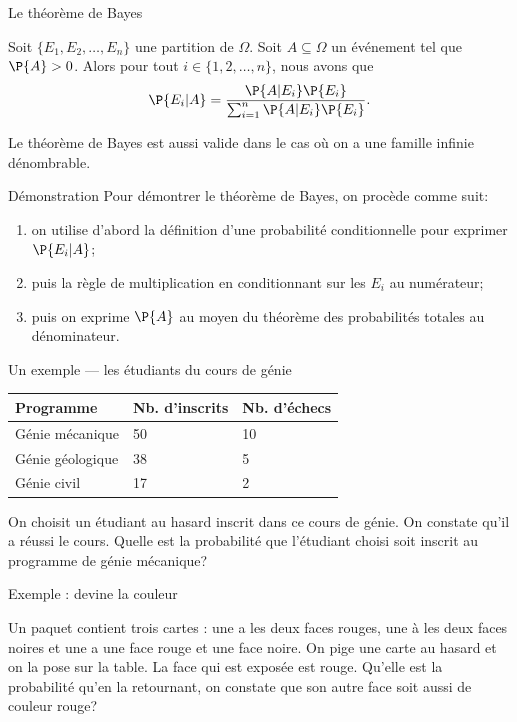 \documentclass[nuit,charter,pied]{BeamerJS}
\begin{document}
\begin{frame}{Le théorème de Bayes}
\pause
	\begin{thm}{}
		Soit $\{E_1,E_2,\ldots,E_n\}$ une partition de $\Omega$. Soit $A\subseteq\Omega$ un événement tel que $\P{A}>0$. Alors pour tout $i\in\{1,2,\ldots,n\}$, nous avons que
		\[\P{E_i|A}=\frac{\P{A|E_i}\P{E_i}}{\sum_{i=1}^{n}\P{A|E_i}\P{E_i}}.\]
	\end{thm}
\pause
	\begin{rem}
	Le théorème de Bayes est aussi valide dans le cas où on a une famille infinie dénombrable.
	\end{rem}
\end{frame}
\begin{frame}{Démonstration}
Pour démontrer le théorème de Bayes, on procède comme suit:\pause
	\begin{enumerate}
		\item on utilise d'abord la définition d'une probabilité conditionnelle pour exprimer $\P{E_i|A}$;\pause
		\item puis la règle de multiplication en conditionnant sur les $E_i$ au numérateur;\pause
		\item puis on exprime $\P{A}$ au moyen du théorème des probabilités totales au dénominateur.
	\end{enumerate}
\end{frame}
\begin{frame}{Un exemple --- les étudiants du cours de génie}
\pause
\begin{ex}
	\begin{center}
	\begin{tabular}{@{}lll@{}}
		\toprule
		Programme        & Nb. d'inscrits & Nb. d'échecs \\ \midrule
		Génie mécanique  & 50             & 10           \\
		Génie géologique & 38             & 5            \\
		Génie civil      & 17             & 2            \\ \bottomrule
	\end{tabular}
	\end{center}
	\pause
On choisit un étudiant au hasard inscrit dans ce cours de génie. On constate qu'il a réussi le cours. Quelle est la probabilité que l'étudiant choisi soit inscrit au programme de génie mécanique?
\end{ex}
\end{frame}
\begin{frame}{Exemple : devine la couleur}
\pause
	\begin{ex}
		Un paquet contient trois cartes : une a les deux faces rouges, une à les deux faces noires et une a une face rouge et une face noire. On pige une carte au hasard et on la pose sur la table. La face qui est exposée est rouge. Qu'elle est la probabilité qu'en la retournant, on constate que son autre face soit aussi de couleur rouge?
	\end{ex}
\end{frame}
\end{document}
